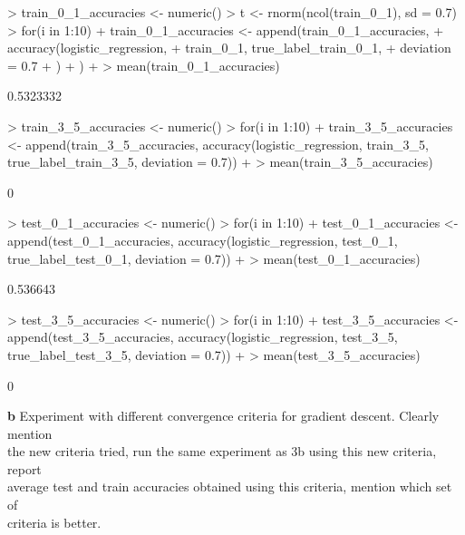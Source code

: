 \documentclass[a4paper]{article}
\begin{document}
\begin{Schunk}
\begin{Sinput}
> train_0_1_accuracies <- numeric()
> t <- rnorm(ncol(train_0_1), sd = 0.7)
> for(i in 1:10){ 
+   train_0_1_accuracies <- append(train_0_1_accuracies, 
+                                  accuracy(logistic_regression, 
+                                           train_0_1, true_label_train_0_1, 
+                                           deviation = 0.7
+                                           )
+                                  )
+ }
> mean(train_0_1_accuracies)
\end{Sinput}
\begin{Soutput}
[1] 0.5323332
\end{Soutput}
\begin{Sinput}
> train_3_5_accuracies <- numeric()
> for(i in 1:10){ 
+   train_3_5_accuracies <- append(train_3_5_accuracies, accuracy(logistic_regression, train_3_5, true_label_train_3_5, deviation = 0.7))
+ }
> mean(train_3_5_accuracies)
\end{Sinput}
\begin{Soutput}
[1] 0
\end{Soutput}
\begin{Sinput}
> test_0_1_accuracies <- numeric()
> for(i in 1:10){
+  test_0_1_accuracies <- append(test_0_1_accuracies, accuracy(logistic_regression, test_0_1, true_label_test_0_1, deviation = 0.7)) 
+ }
> mean(test_0_1_accuracies)
\end{Sinput}
\begin{Soutput}
[1] 0.536643
\end{Soutput}
\begin{Sinput}
> test_3_5_accuracies <- numeric()
> for(i in 1:10){
+   test_3_5_accuracies <- append(test_3_5_accuracies, accuracy(logistic_regression, test_3_5, true_label_test_3_5, deviation = 0.7))
+ }
> mean(test_3_5_accuracies)
\end{Sinput}
\begin{Soutput}
[1] 0
\end{Soutput}
\end{Schunk}

\textbf{b} Experiment with different convergence criteria for gradient descent. Clearly mention \\
the new criteria tried, run the same experiment as 3b using this new criteria, report \\
average test and train accuracies obtained using this criteria, mention which set of \\
criteria is better. \\
\end{document}
